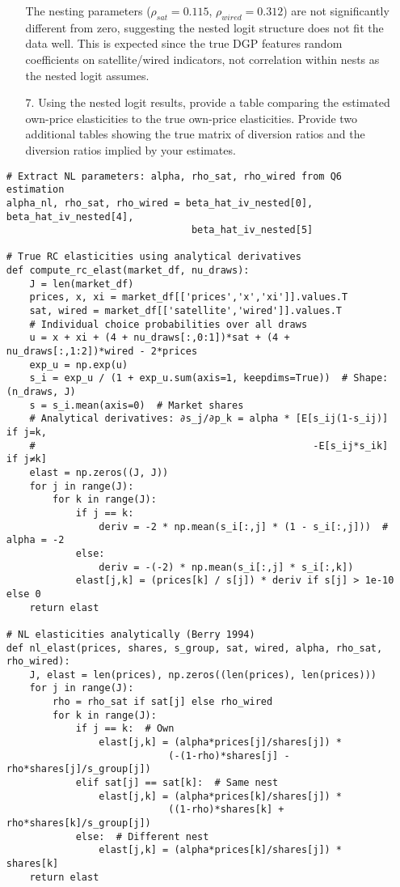 \documentclass[english,11pt]{article}
\begin{document}
\begin{enumerate}
\begin{enumerate}
The nesting parameters ($\rho_{sat} = 0.115$, $\rho_{wired} = 0.312$) are not significantly different from zero, suggesting the nested logit structure does not fit the data well. This is expected since the true DGP features random coefficients on satellite/wired indicators, not correlation within nests as the nested logit assumes.

\item[7.] Using the nested logit results, provide a table comparing the
estimated own-price elasticities to the true own-price elasticities. Provide two
additional tables showing the true matrix of diversion ratios and the
diversion ratios implied by your estimates.
\end{enumerate}

\begin{verbatim}
# Extract NL parameters: alpha, rho_sat, rho_wired from Q6 estimation
alpha_nl, rho_sat, rho_wired = beta_hat_iv_nested[0], beta_hat_iv_nested[4], 
                                beta_hat_iv_nested[5]

# True RC elasticities using analytical derivatives
def compute_rc_elast(market_df, nu_draws):
    J = len(market_df)
    prices, x, xi = market_df[['prices','x','xi']].values.T
    sat, wired = market_df[['satellite','wired']].values.T
    # Individual choice probabilities over all draws
    u = x + xi + (4 + nu_draws[:,0:1])*sat + (4 + nu_draws[:,1:2])*wired - 2*prices
    exp_u = np.exp(u)
    s_i = exp_u / (1 + exp_u.sum(axis=1, keepdims=True))  # Shape: (n_draws, J)
    s = s_i.mean(axis=0)  # Market shares
    # Analytical derivatives: ∂s_j/∂p_k = alpha * [E[s_ij(1-s_ij)] if j=k,
    #                                                -E[s_ij*s_ik] if j≠k]
    elast = np.zeros((J, J))
    for j in range(J):
        for k in range(J):
            if j == k:
                deriv = -2 * np.mean(s_i[:,j] * (1 - s_i[:,j]))  # alpha = -2
            else:
                deriv = -(-2) * np.mean(s_i[:,j] * s_i[:,k])
            elast[j,k] = (prices[k] / s[j]) * deriv if s[j] > 1e-10 else 0
    return elast

# NL elasticities analytically (Berry 1994)
def nl_elast(prices, shares, s_group, sat, wired, alpha, rho_sat, rho_wired):
    J, elast = len(prices), np.zeros((len(prices), len(prices)))
    for j in range(J):
        rho = rho_sat if sat[j] else rho_wired
        for k in range(J):
            if j == k:  # Own
                elast[j,k] = (alpha*prices[j]/shares[j]) * 
                            (-(1-rho)*shares[j] - rho*shares[j]/s_group[j])
            elif sat[j] == sat[k]:  # Same nest
                elast[j,k] = (alpha*prices[k]/shares[j]) * 
                            ((1-rho)*shares[k] + rho*shares[k]/s_group[j])
            else:  # Different nest
                elast[j,k] = (alpha*prices[k]/shares[j]) * shares[k]
    return elast


\end{verbatim}
\end{enumerate}
\end{document}
